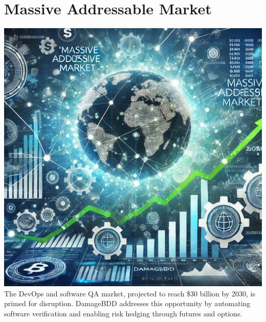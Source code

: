\documentclass[12pt,a4paper]{article}
\begin{document}
\section{Massive Addressable Market}
\includegraphics[width=\textwidth]{compressed/market_opportunity.png} %
The DevOps and software QA market, projected to reach \$30 billion by 2030, is primed for disruption. DamageBDD addresses this opportunity by automating software verification and enabling risk hedging through futures and options.
\end{document}

